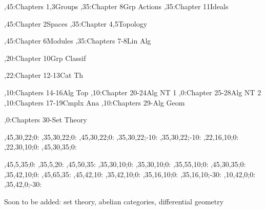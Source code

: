 
\setcounter{diagheight}{50}
\begin{chart}
,45:{Chapters 1,3}{Groups}{}
,35:{Chapter 8}{Grp Actions}{}
,35:{Chapter 11}{Ideals}{}

,45:{Chapter 2}{Spaces}{}
,35:{Chapter 4,5}{Topology}{}

,45:{Chapter 6}{Modules}{}
,35:{Chapters 7-8}{Lin Alg}{}

,20:{Chapter 10}{Grp Classif}{}

,22:{Chapter 12-13}{Cat Th}{}

,10:{Chapters 14-16}{Alg Top}{}
,10:{Chapter 20-24}{Alg NT 1}{}
,0:{Chapter 25-28}{Alg NT 2}{}
,10:{Chapters 17-19}{Cmplx Ana}{}
,10:{Chapters 29-}{Alg Geom}{}

,0:{Chapters 30-}{Set Theory}{}

,45,30,22;0:   %
,35,30,22;0:   %
,45,30,22;0:   %
,35,30,22;-10: %
,35,30,22;-10: %
,22,16,10;0:   %
,22,30,10;0:   %
,45,30,35;0:   %

,45,5,35;0:    %
,35,5,20:      %
,45,50,35:     %
,35,30,10;0:   %
,35,30,10;0:   %
,35,55,10;0:   %
,45,30,35;0:   %
,35,42,10;0:   %
,45,65,35:     %
,45,42,10:     %
,35,42,10;0:   %
,35,16,10;0:   %
,35,16,10;-30: %
,10,42,0;0:    %
,35,42,0;-30:  %
\end{chart}

Soon to be added: set theory, abelian categories, differential geometry
